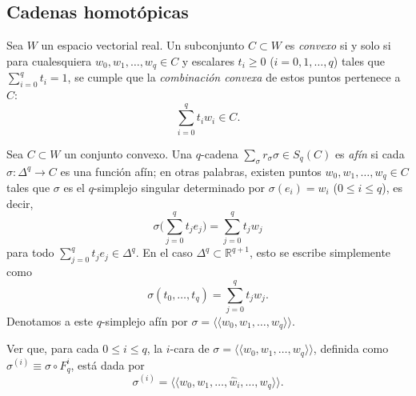 \subsection{Cadenas homotópicas}

\begin{nota}
Sea $W$ un espacio vectorial real. Un subconjunto $C \subset W$ es \textit{convexo} si y solo si para cualesquiera $w_0, w_1, \dots, w_q \in C$ y escalares $t_i \geq 0$ ($i = 0, 1, \dots, q$) tales que $\sum_{i=0}^q t_i = 1$, se cumple que la \textit{combinación convexa} de estos puntos pertenece a $C$:
\[
\sum_{i=0}^q t_i w_i \in C.
\]
\end{nota}
\begin{definicion}
Sea $C \subset W$ un conjunto convexo. Una $q$-cadena $\sum_\sigma r_\sigma \sigma \in S_q(C)$ es \textit{afín} si cada $\sigma \colon \Delta^q \to C$ es una función afín; en otras palabras, existen puntos $w_0, w_1, \dots, w_q \in C$ tales que $\sigma$ es el $q$-simplejo singular determinado por $\sigma(e_i) = w_i$ ($0 \leq i \leq q$), es decir,
\[
\sigma\Big(\sum_{j=0}^q t_j e_j\Big) = \sum_{j=0}^q t_j w_j
\]
para todo $\sum_{j=0}^q t_j e_j \in \Delta^q$. En el caso $\Delta^q \subset \mathbb{R}^{q+1}$, esto se escribe simplemente como
\[
\sigma(t_0, \dots, t_q) = \sum_{j=0}^q t_j w_j.
\]
Denotamos a este $q$-simplejo afín por $\sigma = \langle\!\langle w_0, w_1, \dots, w_q \rangle\!\rangle$.
\end{definicion}

\begin{ejercicio}
Ver que, para cada $0 \leq i \leq q$, la $i$-cara de $\sigma = \langle\!\langle w_0, w_1, \dots, w_q \rangle\!\rangle$, definida como $\sigma^{(i)} \equiv \sigma \circ F_q^i$, está dada por
\[
\sigma^{(i)} = \langle\!\langle w_0, w_1, \dots, \hat{w}_i, \dots, w_q \rangle\!\rangle.
\]
\end{ejercicio}

